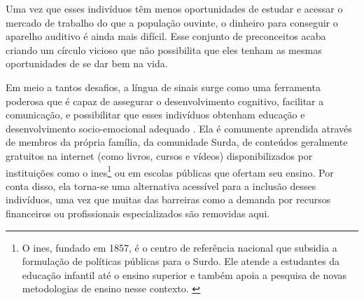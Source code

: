 


\begin{citacao}
    Uma vez que esses indivíduos têm menos oportunidades de estudar e acessar o mercado de trabalho do que a população ouvinte, o dinheiro para conseguir o aparelho auditivo é ainda mais difícil. Esse conjunto de preconceitos acaba criando um círculo vicioso que não possibilita que eles tenham as mesmas oportunidades de se dar bem na vida.~\cite{ebc-2019-10-milhoes-pessoas}
\end{citacao}


Em meio a tantos desafios, a língua de sinais surge como uma ferramenta poderosa que é capaz de assegurar o desenvolvimento cognitivo, facilitar a comunicação, e possibilitar que esses indivíduos obtenham educação e desenvolvimento socio-emocional adequado \cite{who-2021-report-hearing}.
Ela é comumente aprendida através de membros da própria família, da comunidade Surda, de conteúdos geralmente gratuitos na internet (como livros, cursos e vídeos) disponibilizados por instituições como o \acrshort{ines}\footnote{
    O \acrfull{ines}, fundado em 1857, é o centro de referência nacional que subsidia a formulação de políticas públicas para o Surdo. Ele atende a estudantes da educação infantil até o ensino superior e também apoia a pesquisa de novas metodologias de ensino nesse contexto. \cite{mec-2021-conheca-ines}
} ou em escolas públicas que ofertam seu ensino.
Por conta disso, ela torna-se uma alternativa acessível para a inclusão desses indivíduos, uma vez que muitas das barreiras como a demanda por recursos financeiros ou profissionais especializados são removidas aqui.


